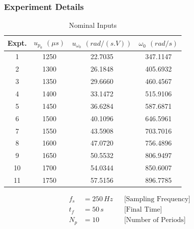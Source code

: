 \subsubsection{Experiment Details}
\begin{table}[H]
    \centering
    \begin{tabular}{c c c c}
        \hline \hline
        Expt. & $u_{p_0}$ $(\mu s)$& $u_{\omega_0}$ $(rad/(s.V))$ & $\omega_0$ $(rad/s)$ \\ \hline \hline
            1 & 1250      &  22.7035       &  347.1147   \\
            2 & 1300      &  26.1848       &  405.6932   \\
            3 & 1350      &  29.6660       &  460.4567   \\
            4 & 1400      &  33.1472       &  515.9106   \\
            5 & 1450      &  36.6284       &  587.6871   \\
            6 & 1500      &  40.1096       &  646.5961   \\
            7 & 1550      &  43.5908       &  703.7016   \\
            8 & 1600      &  47.0720       &  756.4896   \\
            9 & 1650      &  50.5532       &  806.9497   \\
           10 & 1700      &  54.0344       &  850.6007   \\
           11 & 1750      &  57.5156       &  896.7785   \\
           \hline \hline
    \end{tabular}
    \caption{Nominal Inputs}
    \label{tab::nom_in}
\end{table}

\begin{align*}
   f_s &= 250 \, Hz & & \text{[Sampling Frequency]}\\
   t_f &= 50 \,s    & & \text{[Final Time]}\\
   N_p &= 10        & & \text{[Number of Periods]}
\end{align*}



